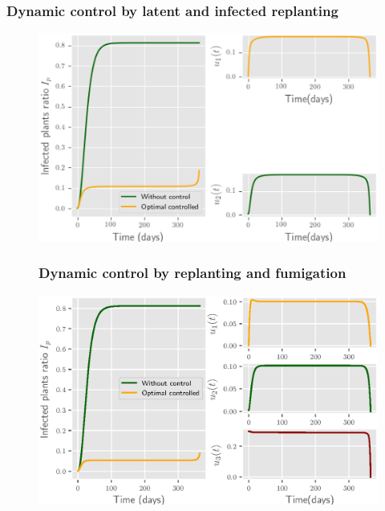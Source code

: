 	\begin{frame}[plain]
		\frametitle{Dynamic control by latent and infected replanting}
		\begin{figure}
			\centering	
			\includegraphics[scale=0.5]{Feathergraphics/two_control_simulation_1.eps}
		\end{figure}	
	\end{frame}
	\begin{frame}
		\begin{figure}
			\frametitle{Dynamic control by replanting and fumigation}
			\centering	
			\includegraphics[scale=0.5]{Feathergraphics/three_controls_simulation_1.eps}
		\end{figure}	
	\end{frame}

